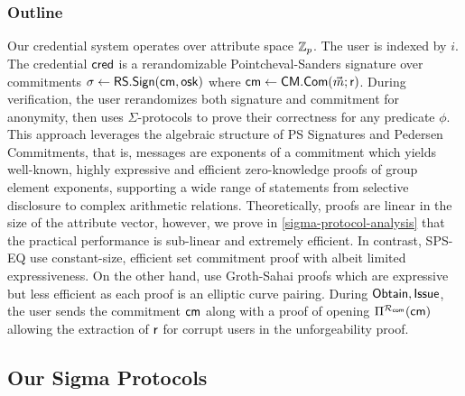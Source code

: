 \subsubsection{Outline}
Our credential system operates over attribute space $\mathbb{Z}_p$. The user is indexed by $i$. The credential $\mathsf{cred}$ is a rerandomizable Pointcheval-Sanders signature over commitments $\sigma \gets \mathsf{RS.Sign}(\mathsf{cm}, \mathsf{osk})$ where $\mathsf{cm} \gets \mathsf{CM.Com}(\vec{m}; \mathsf{r})$. During verification, the user rerandomizes both signature and commitment for anonymity, then uses $\Sigma$-protocols to prove their correctness for any predicate $\phi$. This approach leverages the algebraic structure of PS Signatures and Pedersen Commitments, that is, messages are exponents of a commitment which yields well-known, highly expressive and efficient zero-knowledge proofs of group element exponents, supporting a wide range of statements from selective disclosure to complex arithmetic relations. Theoretically, proofs are linear in the size of the attribute vector, however, we prove in \ref{sigma-protocol-analysis} that the practical performance is sub-linear and extremely efficient. In contrast, SPS-EQ \cite{fuchsbauer_structure-preserving_2019, hanaoka_improved_2022} use constant-size, efficient set commitment proof with albeit limited expressiveness. On the other hand, \cite{rabaninejad_attribute-based_2024} use Groth-Sahai proofs which are expressive but less efficient as each proof is an elliptic curve pairing. During $\mathsf{Obtain}, \mathsf{Issue}$, the user sends the commitment $\mathsf{cm}$ along with a proof of opening $\Pi^{\mathcal{R}_{\mathsf{com}}}(\mathsf{cm})$ allowing the extraction of $\mathsf{r}$ for corrupt users in the unforgeability proof.



\subsection{Our Sigma Protocols}


